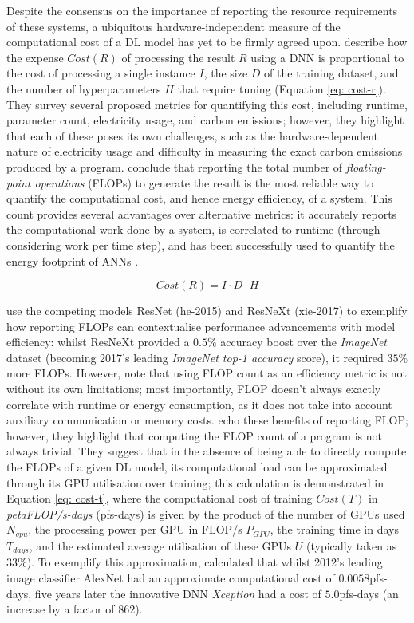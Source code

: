 \documentclass[a4paper, 11pt]{report}
\begin{document}
    Despite the consensus on the importance of reporting the resource requirements of these systems, a ubiquitous hardware-independent measure of the computational cost of a DL model has yet to be firmly agreed upon. \citet{schwartz-2019} describe how the expense $Cost(R)$ of processing the result $R$ using a DNN is proportional to the cost of processing a single instance $I$, the size $D$ of the training dataset, and the number of hyperparameters $H$ that require tuning (Equation \ref{eq: cost-r}). They survey several proposed metrics for quantifying this cost, including runtime, parameter count, electricity usage, and carbon emissions; however, they highlight that each of these poses its own challenges, such as the hardware-dependent nature of electricity usage and difficulty in measuring the exact carbon emissions produced by a program. \citet{schwartz-2019} conclude that reporting the total number of \emph{floating-point operations} (FLOPs) to generate the result is the most reliable way to quantify the computational cost, and hence energy efficiency, of a system. This count provides several advantages over alternative metrics: it accurately reports the computational work done by a system, is correlated to runtime (through considering work per time step), and has been successfully used to quantify the energy footprint of ANNs \citep{veniat-2018}.

    \begin{equation}
        \label{eq: cost-r}
        Cost(R) = I \cdot D \cdot H
    \end{equation}

    \citet{schwartz-2019} use the competing models ResNet (he-2015) and ResNeXt (xie-2017) to exemplify how reporting FLOPs can contextualise performance advancements with model efficiency: whilst ResNeXt provided a $0.5\%$ accuracy boost over the \emph{ImageNet} dataset (becoming 2017's leading \emph{ImageNet top-1 accuracy} score), it required $35\%$ more FLOPs. However, \citet{schwartz-2019} note that using FLOP count as an efficiency metric is not without its own limitations; most importantly, FLOP doesn't always exactly correlate with runtime or energy consumption, as it does not take into account auxiliary communication or memory costs. \citet{amodei-2018} echo these benefits of reporting FLOP; however, they highlight that computing the FLOP count of a program is not always trivial. They suggest that in the absence of being able to directly compute the FLOPs of a given DL model, its computational load can be approximated through its GPU utilisation over training; this calculation is demonstrated in Equation \ref{eq: cost-t}, where the computational cost of training $Cost(T)$ in \emph{petaFLOP/s-days} (pfs-days) is given by the product of the number of GPUs used $N_{gpu}$, the processing power per GPU in FLOP/s $P_{GPU}$, the training time in days $T_{days}$, and the estimated average utilisation of these GPUs $U$ (typically taken as $33\%$). To exemplify this approximation, \citet{amodei-2018} calculated that whilst 2012's leading image classifier AlexNet \citep{krizhevsky-2012} had an approximate computational cost of $0.0058$pfs-days, five years later the innovative DNN \emph{Xception} \citep{chollet-2017} had a cost of $5.0$pfs-days (an increase by a factor of $862$).
\end{document}
